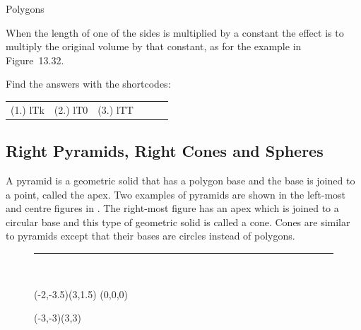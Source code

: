 \begin{exercises}{Polygons}
{\begin{mdframed}[linewidth=4, leftmargin=40, rightmargin=40]
\begin{exercise}
    \end{exercise}
    \end{mdframed}
    }
    \noindent
  
        \label{m39357*id64533}When the length of one of the sides is multiplied by a constant the effect is to multiply the original volume by that constant, as for the example in Figure~13.32.\par 
      
    

  \label{m39357*cid323}
\par {} Find the answers with the shortcodes:
 \par \begin{tabular}[h]{cccccc}
 (1.) lTk  &  (2.) lT0  &  (3.) lTT  & \end{tabular}



\subsection{ Right Pyramids, Right Cones and Spheres}
      
A pyramid is a geometric solid that has a polygon base and the base is joined to a point, called the apex. Two examples of pyramids are shown in the left-most and centre figures in . The right-most figure has an apex which is joined to a circular base and this type of geometric solid is called a cone. Cones are similar to pyramids except that their bases are circles instead of polygons.\par 
      
\begin{figure}[H]
    \begin{center}
	\rule[.1in]{\figurerulewidth}{.005in} \\
	
	\begin{pspicture}(-2,-3.5)(3,1.5)
	    \psSolid[object=face,fillcolor=cyan,opacity=0.5,base=-0.0 -0.5 1 -0.5 0 0.5](0,0,0)
	    \psSolid[object=tetrahedron,action=draw,r=1,linecolor=blue,action=draw]

	    
	\end{pspicture}

	\begin{pspicture}(-3,-3)(3,3)
	    \psSolid[object=sphere,fillstyle=hue,fillcolor=cyan,ngrid=50 50,RotX=180,RotZ=30,grid=false]
	\end{pspicture}


\end{center}
\end{figure}
\end{exercises}

